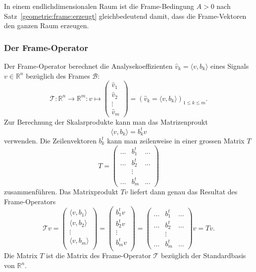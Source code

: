In einem endlichdimensionalen Raum ist die Frame-Bedingung $A>0$ 
nach Satz~\ref{geometrie:frame:erzeugt}
gleichbedeutend damit, dass die Frame-Vektoren den ganzen Raum erzeugen.

\subsubsection{Der Frame-Operator}
Der Frame-Operator berechnet die Analysekoeffizienten
$\hat{v}_k=\langle v,b_k\rangle$ eines Signals
$v\in \mathbb R^n$ bezüglich des Frames $\mathcal{B}$:
\[
\mathcal{T}\colon \mathbb R^n \to \mathbb R^m
:
v \mapsto
\begin{pmatrix}
\hat{v}_1\\\hat{v}_2\\\vdots\\\hat{v}_m
\end{pmatrix}
=
(\hat{v}_k=\langle v,b_k\rangle)_{1\le k\le m}.
\]
Zur Berechnung der Skalarprodukte kann man das Matrizenproukt
\[
\langle v,b_k\rangle
=
b_k^t v
\]
verwenden.
Die Zeilenvektoren $b_k^t$ kann man zeilenweise in einer grossen Matrix $T$
\[
T 
=
\begin{pmatrix}
\dots&b_1^t &\dots\\
\dots&b_2^t &\dots\\
     &\vdots&     \\
\dots&b_m^t &\dots
\end{pmatrix}
\]
zusammenführen.
Das Matrixprodukt $Tv$ liefert dann genau das Resultat des Frame-Operators
\[
\mathcal{T} v
=
\begin{pmatrix}
\langle v, b_1\rangle\\
\langle v, b_2\rangle\\
\vdots\\
\langle v, b_m\rangle\\
\end{pmatrix}
=
\begin{pmatrix}
b_1^tv\\
b_2^tv\\
\vdots\\
b_m^tv\\
\end{pmatrix}
=
\begin{pmatrix}
\dots&b_1^t &\dots\\
\dots&b_2^t &\dots\\
     &\vdots&     \\
\dots&b_m^t &\dots
\end{pmatrix}
v
=
Tv.
\]
Die Matrix $T$ ist die Matrix des Frame-Operator $\mathcal T$ bezüglich der
Standardbasis von $\mathbb R^n$.

